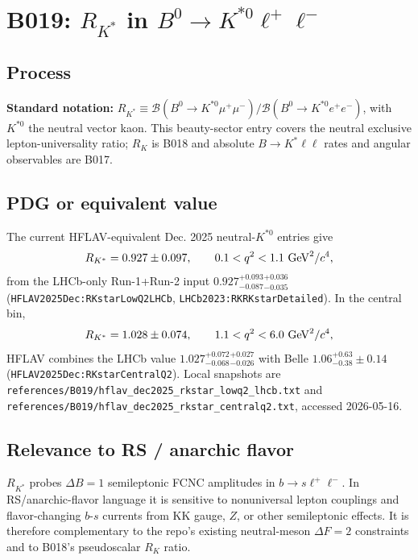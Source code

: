 
\section{B019: \(R_{K^*}\) in \(B^0\to K^{*0}\ell^+\ell^-\)}

\subsection*{Process}
\textbf{Standard notation:} \(R_{K^*}\equiv
\mathcal{B}(B^0\to K^{*0}\mu^+\mu^-)/\mathcal{B}(B^0\to
K^{*0}e^+e^-)\), with \(K^{*0}\) the neutral vector kaon.  This beauty-sector
entry covers the neutral exclusive lepton-universality ratio; \(R_K\) is B018
and absolute \(B\to K^*\ell\ell\) rates and angular observables are B017.

\subsection*{PDG or equivalent value}
The current HFLAV-equivalent Dec. 2025 neutral-\(K^{*0}\) entries give
\[
  R_{K^*}=0.927\pm0.097,\qquad 0.1<q^2<1.1~{\rm GeV}^2/c^4,
\]
from the LHCb-only Run-1+Run-2 input
\(0.927^{+0.093}_{-0.087}{}^{+0.036}_{-0.035}\)
(\texttt{HFLAV2025Dec:RKstarLowQ2LHCb},
\texttt{LHCb2023:RKRKstarDetailed}).  In the central bin,
\[
  R_{K^*}=1.028\pm0.074,\qquad 1.1<q^2<6.0~{\rm GeV}^2/c^4,
\]
HFLAV combines the LHCb value
\(1.027^{+0.072}_{-0.068}{}^{+0.027}_{-0.026}\) with Belle
\(1.06^{+0.63}_{-0.38}\pm0.14\)
(\texttt{HFLAV2025Dec:RKstarCentralQ2}).  Local snapshots are
\texttt{references/B019/hflav\_dec2025\_rkstar\_lowq2\_lhcb.txt} and
\texttt{references/B019/hflav\_dec2025\_rkstar\_centralq2.txt}, accessed
2026-05-16.

\subsection*{Relevance to RS / anarchic flavor}
\(R_{K^*}\) probes \(\Delta B=1\) semileptonic FCNC amplitudes in
\(b\to s\ell^+\ell^-\).  In RS/anarchic-flavor language it is sensitive to
nonuniversal lepton couplings and flavor-changing \(b\)-\(s\) currents from
KK gauge, \(Z\), or other semileptonic effects.  It is therefore
complementary to the repo's existing neutral-meson \(\Delta F=2\) constraints
and to B018's pseudoscalar \(R_K\) ratio.


